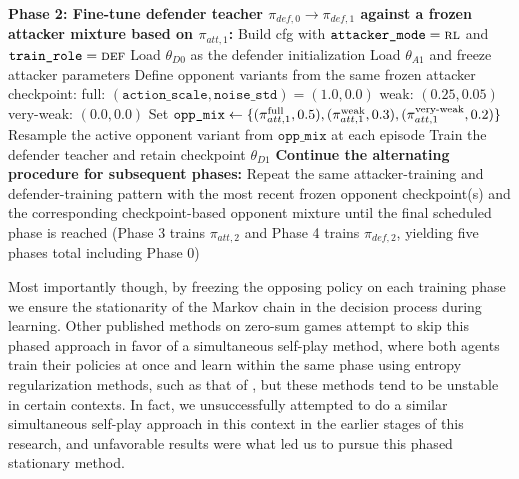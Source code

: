 \begin{algorithm}[H]
\begin{algorithmic}[1]
\State \textbf{Phase 2: Fine-tune defender teacher $\pi_{def,0}\!\rightarrow\!\pi_{def,1}$ against a frozen attacker mixture based on $\pi_{att,1}$:}
\State \hspace{1em} Build cfg with $\texttt{attacker\_mode}=\textsc{rl}$ and $\texttt{train\_role}=\textsc{def}$
\State \hspace{1em} Load $\theta_{D0}$ as the defender initialization
\State \hspace{1em} Load $\theta_{A1}$ and freeze attacker parameters
\State \hspace{1em} Define opponent variants from the same frozen attacker checkpoint:
\Statex \hspace{2em} full: $(\texttt{action\_scale},\texttt{noise\_std})=(1.0,0.0)$
\Statex \hspace{2em} weak: $(0.25,0.05)$
\Statex \hspace{2em} very-weak: $(0.0,0.0)$
\State \hspace{1em} Set
\Statex \hspace{2em}
$\texttt{opp\_mix}\gets\{(\pi_{att,1}^{\text{full}},0.5),(\pi_{att,1}^{\text{weak}},0.3),(\pi_{att,1}^{\text{very\mbox{-}weak}},0.2)\}$
\State \hspace{1em} Resample the active opponent variant from $\texttt{opp\_mix}$ at each episode
\State \hspace{1em} Train the defender teacher and retain checkpoint $\theta_{D1}$
\State \textbf{Continue the alternating procedure for subsequent phases:}
\State \hspace{1em} Repeat the same attacker-training and defender-training pattern with the most recent frozen opponent checkpoint(s) and the corresponding checkpoint-based opponent mixture until the final scheduled phase is reached (Phase 3 trains $\pi_{att,2}$ and Phase 4 trains $\pi_{def,2}$, yielding five phases total including Phase 0)
\end{algorithmic}
\end{algorithm}


Most importantly though, by freezing the opposing policy on each training phase we ensure the stationarity of the Markov chain in the decision process during learning. Other published methods on zero-sum games attempt to skip this phased approach in favor of a simultaneous self-play method, where both agents train their policies at once and learn within the same phase using entropy regularization methods, such as that of \cite{rudolph2025reevaluating}, but these methods tend to be unstable in certain contexts. In fact, we unsuccessfully attempted to do a similar simultaneous self-play approach in this context in the earlier stages of this research, and unfavorable results were what led us to pursue this phased stationary method.

